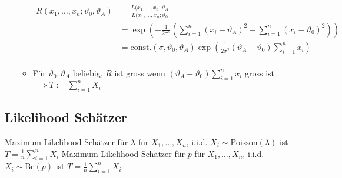 \begin{itemize}
\begin{itemize}
                \begin{align*}
                    R(x_1, \dots, x_n; \vartheta_0, \vartheta_A) &= \frac{L(x_1, \dots, x_n; \vartheta_A}{L(x_1, \dots, x_n; \vartheta_0}\\
                                                                 &= \exp \left( -\frac{1}{2 \sigma^2} \left( \sum_{i=1}^n (x_i - \vartheta_A)^2 - \sum_{i=1}^n (x_i - \vartheta_0)^2 \right) \right)\\
                                                                 &= \text{const.}(\sigma, \vartheta_0, \vartheta_A) \exp \left( \frac{1}{2 \sigma^2} (\vartheta_A - \vartheta_0) \sum_{i=1}^n x_i \right)\\
                \end{align*}
            \item Für $\vartheta_0, \vartheta_A$ beliebig, $R$ ist gross wenn $(\vartheta_A - \vartheta_0) \sum_{i=1}^n x_i$ gross ist $\implies T := \sum_{i=1}^n X_i$
        \end{itemize}
\end{itemize}

\subsection{Likelihood Schätzer}
\begin{itemize}
     Maximum-Likelihood Schätzer für $\lambda$ für $X_1, \dots, X_n$, i.i.d. $X_i \sim \text{Poisson}(\lambda)$ ist $T = \frac{1}{n} \sum_{i=1}^n X_i$
     Maximum-Likelihood Schätzer für $p$ für $X_1, \dots, X_n$, i.i.d. $X_i \sim \text{Be}(p)$ ist $T = \frac{1}{n} \sum_{i=1}^n X_i$
\end{itemize}
